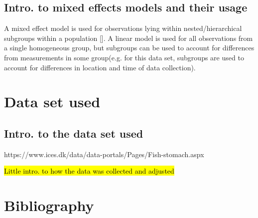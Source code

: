 \documentclass{article}
\begin{document}
\subsection{Intro. to mixed effects models and their usage}

A mixed effect model is used for observations lying within nested/hierarchical subgroups within a population [\cite{pinheiro2000}]. A linear model is used for all observations from a single homogeneous group, but subgroups can be used to account for differences from measurements in some group(e.g. for this data set, subgroups are used to account for differences in location and time of data collection).

\section{Data set used}

\subsection{Intro. to the data set used}

https://www.ices.dk/data/data-portals/Pages/Fish-stomach.aspx

\hl{Little intro. to how the data was collected and adjusted}

\section{Bibliography}

\printbibliography
\end{document}
